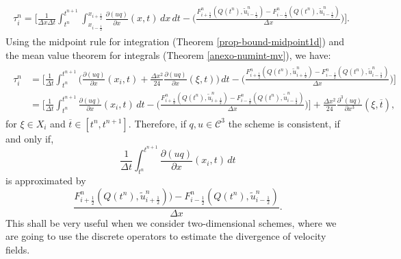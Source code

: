 \begin{align*}
	\begin{split}
		\tau_{i}^n = 
		\bigg[ \frac{1}{\Delta x \Delta t}  \int_{t^{n}}^{t^{n+1}} \int_{x_{i-\frac{1}{2}}}^{x_{i+\frac{1}{2}}}
		{\frac{\partial (uq)}{\partial x}}(x, t) \,dx \,dt - 
		\bigg(\frac{{F}^n_{i+\frac{1}{2}}(Q(t^n),\tilde{u}^n_{i-\frac{1}{2}})-{F}^n_{i-\frac{1}{2}}(Q(t^n),\tilde{u}^n_{i-\frac{1}{2}})}{\Delta x} \bigg)
		\bigg].
	\end{split}
\end{align*}
Using the midpoint rule for integration (Theorem \ref{prop-bound-midpoint1d}) and the mean value theorem for integrals
(Theorem \ref{anexo-numint-mv}), 
we have:
\begin{align}
	\begin{split}
		\label{consistency-1d-eq3}
		\tau_{i}^n 
		&= 
		\bigg[ \frac{1}{\Delta t}  \int_{t^{n}}^{t^{n+1}}
		{\bigg(\frac{\partial (uq)}{\partial x}}(x_i, t) + \frac{\Delta x^2}{24}\frac{\partial (uq)}{\partial x}(\xi, t) \bigg) \,dt - 
		\bigg(\frac{{F}^n_{i+\frac{1}{2}}(Q(t^n),\tilde{u}^n_{i+\frac{1}{2}})
			-{F}^n_{i-\frac{1}{2}}(Q(t^n),\tilde{u}^n_{i-\frac{1}{2}})}{\Delta x} \bigg)
		\bigg] \\
		& = 
		\bigg[ \frac{1}{\Delta t}  \int_{t^{n}}^{t^{n+1}}
		{\frac{\partial (uq)}{\partial x}}(x_i, t) \,dt - 
		\bigg(\frac{{F}^n_{i+\frac{1}{2}}(Q(t^n),\tilde{u}^n_{i+\frac{1}{2}}) - {F}^n_{i-\frac{1}{2}}(Q(t^n),\tilde{u}^n_{i-\frac{1}{2}})}{\Delta x} \bigg)
		\bigg] +  \frac{\Delta x^2}{24}\frac{\partial^3 (uq)}{\partial x^3}(\xi, \overline{t}), 
	\end{split}
\end{align}
for $\xi \in X_i$ and $\overline{t} \in [t^{n},t^{n+1}]$. Therefore, if $q,u \in \mathcal{C}^3$ the scheme is
consistent, if and only if, 
$$\frac{1}{\Delta t}  \int_{t^{n}}^{t^{n+1}} {\frac{\partial (uq)}{\partial x}}(x_i, t) \,dt$$
is approximated by 
$$\frac{{F}^n_{i+\frac{1}{2}}(Q(t^n),\tilde{u}^n_{i+\frac{1}{2}})) -{F}^n_{i-\frac{1}{2}}(Q(t^n),\tilde{u}^n_{i-\frac{1}{2}})}{\Delta x}.$$
This shall be very useful when we consider two-dimensional schemes, where we are going to use the discrete operators to estimate the divergence
of velocity fields.

